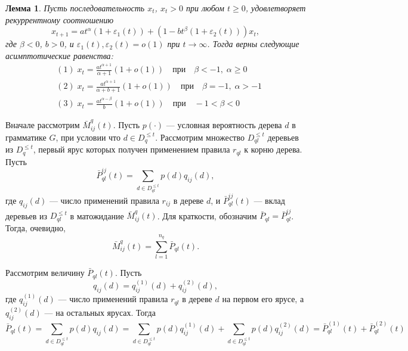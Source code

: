 \documentclass[11pt]{article}
\newtheorem{lemma}{Лемма}
\begin{document}
\begin{lemma}
\label{l:x_rec}
    Пусть последовательность ${x_t}$, $x_t > 0$ при любом $t \geqslant 0$, удовлетворяет рекуррентному соотношению
    \begin{equation}
        x_{t+1} = a t^{\alpha} (1 + \varepsilon_1(t)) + (1 - b t^{\beta} (1 + \varepsilon_2(t))) x_t,
    \end{equation}
    где $\beta < 0$, $b > 0$, и $\varepsilon_1(t), \varepsilon_2(t) = o(1)$ при $t \rightarrow \infty$. Тогда верны следующие асимптотические равенства:
    \begin{equation}
        \begin{split}
            &(1)\;x_t = \frac{a t^{\alpha + 1}}{\alpha + 1} (1 + o(1))\quad\text{при}\quad\beta < -1,\;\alpha \geqslant 0 \\
            &(2)\;x_t = \frac{a t^{\alpha + 1}}{\alpha + b + 1} (1 + o(1))\quad\text{при}\quad\beta = -1,\;\alpha > -1 \\
            &(3)\;x_t = \frac{a t^{\alpha - \beta}}{b} (1 + o(1))\quad\text{при}\quad{}-1 < \beta < 0
        \end{split}
    \end{equation}
\end{lemma}

Вначале рассмотрим $\bar{M}^q_{ij}(t)$. Пусть $p(\cdot)$ --- условная вероятность дерева $d$ в грамматике $G$, при условии что $d \in D_q^{\leqslant t}$. Рассмотрим множество $D_{ql}^{\leqslant t}$ деревьев из $D_q^{\leqslant t}$, первый ярус которых получен применением правила $r_{ql}$ к корню дерева. Пусть
\begin{equation}
    \bar{P}_{ql}^{ij}(t) = \sum_{d \in D_{ql}^{\leqslant t}} p(d) q_{ij}(d),
\end{equation}
где $q_{ij}(d)$ --- число применений правила $r_{ij}$ в дереве $d$, и $\bar{P}_{ql}^{ij}(t)$ --- вклад деревьев из $D_{ql}^{\leqslant t}$ в матожидание $\bar{M}^q_{ij}(t)$. Для краткости, обозначим $\bar{P}_{ql} = \bar{P}_{ql}^{ij}$. Тогда, очевидно,
\begin{equation}
    \bar{M}^q_{ij}(t) = \sum_{l = 1}^{n_q} \bar{P}_{ql}(t).
\end{equation}

Рассмотрим величину $\bar{P}_{ql}(t)$. Пусть
\begin{equation}
    q_{ij}(d) = q^{(1)}_{ij}(d) + q^{(2)}_{ij}(d),
\end{equation}
где $q^{(1)}_{ij}(d)$ --- число применений правила $r_{ql}$ в дереве $d$ на первом его ярусе, а $q^{(2)}_{ij}(d)$ --- на остальных ярусах. Тогда
\begin{equation}
\label{eq:bar_p_12}
    \bar{P}_{ql}(t) = \sum_{d \in D_{ql}^{\leqslant t}} p(d) q_{ij}(d) = \sum_{d \in D_{ql}^{\leqslant t}} p(d) q^{(1)}_{ij}(d) + \sum_{d \in D_{ql}^{\leqslant t}} p(d) q^{(2)}_{ij}(d) = \bar{P}^{(1)}_{ql}(t) + \bar{P}^{(2)}_{ql}(t)
\end{equation}
\end{document}
